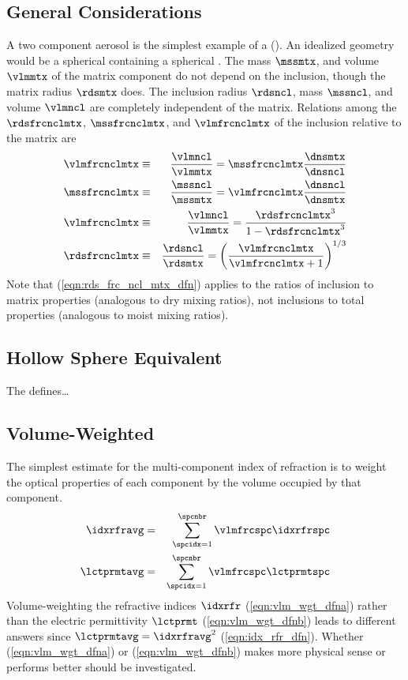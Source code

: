 \documentclass[12pt,twoside]{book}
\begin{document}
\subsection[General Considerations]{General Considerations}\label{sxn:ema_gnr}
A two component aerosol is the simplest example of a 
 ().
An idealized geometry would be a spherical  
containing a spherical . 
The mass $\mssmtx$, and volume $\vlmmtx$ of the matrix component do
not depend on the inclusion, though the matrix radius $\rdsmtx$ does. 
The inclusion radius $\rdsncl$, mass $\mssncl$, and volume $\vlmncl$
are completely independent of the matrix.
Relations among the 
 $\rdsfrcnclmtx$, 
 $\mssfrcnclmtx$, and
 $\vlmfrcnclmtx$ of the inclusion relative to
the matrix are
\begin{eqnarray}
\vlmfrcnclmtx & \equiv & \frac{\vlmncl}{\vlmmtx} = \mssfrcnclmtx \frac{\dnsmtx}{\dnsncl} \\
\mssfrcnclmtx & \equiv & \frac{\mssncl}{\mssmtx} = \vlmfrcnclmtx \frac{\dnsncl}{\dnsmtx} \\
\vlmfrcnclmtx & \equiv & \frac{\vlmncl}{\vlmmtx} = \frac{\rdsfrcnclmtx^{3}}{1-\rdsfrcnclmtx^{3}} \\
\rdsfrcnclmtx & \equiv & \frac{\rdsncl}{\rdsmtx} = \left(\frac{\vlmfrcnclmtx}{\vlmfrcnclmtx+1}\right)^{1/3}
\label{eqn:rds_frc_ncl_mtx_dfn}
\end{eqnarray}
Note that (\ref{eqn:rds_frc_ncl_mtx_dfn}) applies to the ratios of
inclusion to matrix properties (analogous to dry mixing ratios), not
inclusions to total properties (analogous to moist mixing ratios). 

\subsection[Hollow Sphere Equivalent]{Hollow Sphere Equivalent}\label{sxn:hse_apx}
The 
\cite[][p.~149]{BoH83} defines\ldots %

\subsection[Volume-Weighted]{Volume-Weighted}\label{sxn:vlw_apx}
The simplest estimate for the multi-component index of refraction is
to weight the optical properties of each component by the volume
occupied by that component.
\begin{eqnarray}
\label{eqn:vlm_wgt_dfna}
\idxrfravg & = & \sum_{\spcidx = 1}^{\spcnbr} \vlmfrcspc \idxrfrspc \\
\label{eqn:vlm_wgt_dfnb}
\lctprmtavg & = & \sum_{\spcidx = 1}^{\spcnbr} \vlmfrcspc \lctprmtspc
\end{eqnarray}
Volume-weighting the refractive indices $\idxrfr$
(\ref{eqn:vlm_wgt_dfna}) rather than the electric permittivity
$\lctprmt$ (\ref{eqn:vlm_wgt_dfnb}) leads to different answers since  
$\lctprmtavg = \idxrfravg^{2}$ (\ref{eqn:idx_rfr_dfn}).
Whether (\ref{eqn:vlm_wgt_dfna}) or (\ref{eqn:vlm_wgt_dfnb}) makes
more physical sense or performs better should be investigated.
\end{document}
